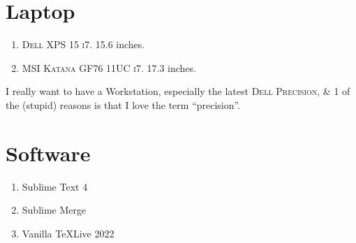 \documentclass[oneside]{book}
\numberwithin{equation}{section}
\begin{document}
\section{Laptop}

\begin{enumerate}
	\item \textsc{Dell XPS 15 i7.} 15.6 inches.
	\item \textsc{MSI Katana GF76 11UC i7.} 17.3 inches.
\end{enumerate}
I really want to have a Workstation, especially the latest \textsc{Dell Precision}, \& 1 of the (stupid) reasons is that I love the term ``precision''.

\section{Software}

\begin{enumerate}
	\item Sublime Text 4
	\item Sublime Merge
	\item Vanilla \TeX Live 2022
\end{enumerate}


\printbibliography[heading=bibintoc]
\end{document}
